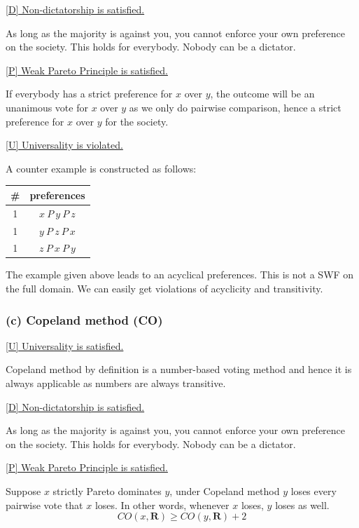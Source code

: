 \documentclass[a4paper]{article}
\begin{document}
\underline{[D] Non-dictatorship is satisfied.} 

As long as the majority is against you, you cannot enforce your own preference on the society. This holds for everybody. Nobody can be a dictator.

\underline{[P] Weak Pareto Principle is satisfied.}

If everybody has a strict preference for $x$ over $y$, the outcome will be an unanimous vote for $x$ over $y$ as we only do pairwise comparison, hence a strict preference for $x$ over $y$ for the society.

\underline{[U] Universality is violated.}

A counter example is constructed as follows:

\begin{table}[!htbp]
    \centering
    \begin{tabular}{c|c|}
        \# & preferences         \\ 
        \hline
        1  & $x\: P\: y\: P\: z$ \\
        1  & $y\: P\: z\: P\: x$ \\
        1  & $z\: P\: x\: P\: y$ \\
        \hline
    \end{tabular}
\end{table}

The example given above leads to an acyclical preferences. This is not a SWF on the full domain. We can easily get violations of acyclicity and transitivity.

\subsubsection*{(c) Copeland method (CO)}

\underline{[U] Universality is satisfied.}

Copeland method by definition is a number-based voting method and hence it is always applicable as numbers are always transitive.

\underline{[D] Non-dictatorship is satisfied.} 

As long as the majority is against you, you cannot enforce your own preference on the society. This holds for everybody. Nobody can be a dictator.

\underline{[P] Weak Pareto Principle is satisfied.}

Suppose $x$ strictly Pareto dominates $y$, under Copeland method $y$ loses every pairwise vote that $x$ loses. In other words, whenever $x$ loses, $y$ loses as well. 
\[CO(x, \mathbf{R}) \geq CO(y,\mathbf{R})+2 \]
\end{document}
